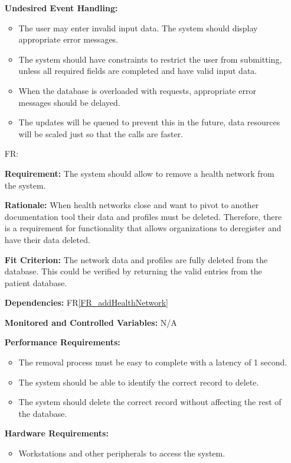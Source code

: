 \documentclass[12pt]{article}
\newcounter{reqnum} %
\begin{document}
\begin{itemize}
\textbf{Undesired Event Handling:} 
\begin{itemize}
  \item The user may enter invalid input data. The system should display appropriate error messages. 
  \item The system should have constraints to restrict the user from submitting, unless all required fields are completed and have valid input data. 
  \item When the database is overloaded with requests, appropriate error messages should be delayed. 
  \item The updates will be queued to prevent this in the future, data resources will be scaled just so that the calls are faster.
\end{itemize}


\item[FR\refstepcounter{reqnum}\thereqnum \label{FR_removeHealthNetwork}:]  

\textbf{Requirement:} The system should allow to remove a health network from the system.

\textbf{Rationale:} 
When health networks close and want to pivot to another documentation tool their data and profiles must be deleted. Therefore, there is a requirement for functionality that allows organizations to deregister and have their data deleted.

\textbf{Fit Criterion:} 
The network data and profiles are fully deleted from the database. This could be verified by returning the valid entries from the patient database.

\textbf{Dependencies:} FR\ref{FR_addHealthNetwork} 

\textbf{Monitored and Controlled Variables:} N/A

\textbf{Performance Requirements:} 
\begin{itemize}
  \item The removal process must be easy to complete with a latency of 1 second. 
  \item The system should be able to identify the correct record to delete. 
  \item The system should delete the correct record without affecting the rest of the database. 
\end{itemize}

\textbf{Hardware Requirements:} 
\begin{itemize}
  \item Workstations and other peripherals to access the system.
\end{itemize}


\end{itemize}
\end{document}
